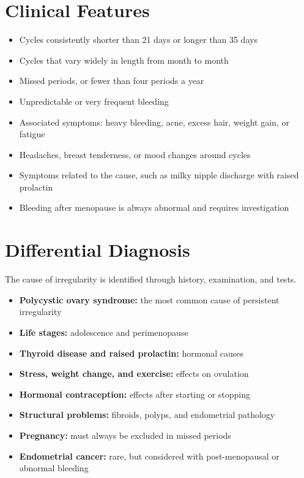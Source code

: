 \section*{Clinical Features}
\begin{itemize}
    \item Cycles consistently shorter than 21 days or longer than 35 days
    \item Cycles that vary widely in length from month to month
    \item Missed periods, or fewer than four periods a year
    \item Unpredictable or very frequent bleeding
    \item Associated symptoms: heavy bleeding, acne, excess hair, weight gain, or fatigue
    \item Headaches, breast tenderness, or mood changes around cycles
    \item Symptoms related to the cause, such as milky nipple discharge with raised prolactin
    \item Bleeding after menopause is always abnormal and requires investigation
\end{itemize}

\section*{Differential Diagnosis}
The cause of irregularity is identified through history, examination, and tests.
\begin{itemize}
    \item \textbf{Polycystic ovary syndrome:} the most common cause of persistent irregularity
    \item \textbf{Life stages:} adolescence and perimenopause
    \item \textbf{Thyroid disease and raised prolactin:} hormonal causes
    \item \textbf{Stress, weight change, and exercise:} effects on ovulation
    \item \textbf{Hormonal contraception:} effects after starting or stopping
    \item \textbf{Structural problems:} fibroids, polyps, and endometrial pathology
    \item \textbf{Pregnancy:} must always be excluded in missed periods
    \item \textbf{Endometrial cancer:} rare, but considered with post-menopausal or abnormal bleeding
\end{itemize}

